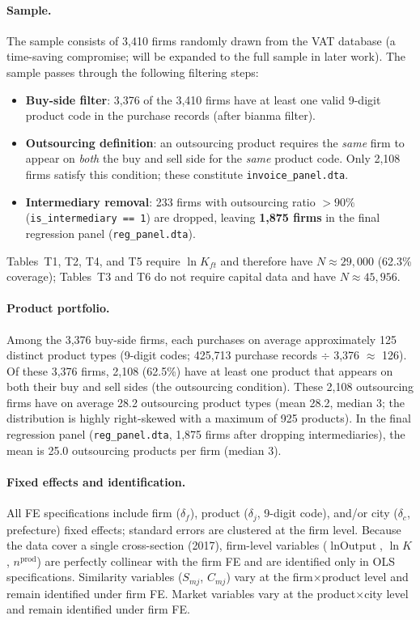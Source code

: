 \documentclass[12pt]{article}
\begin{document}
\paragraph{Sample.}
The sample consists of 3,410 firms randomly drawn from the VAT database
(a time-saving compromise; will be expanded to the full sample in later work).
The sample passes through the following filtering steps:
\begin{itemize}[leftmargin=1.5em,nosep]
  \item \textbf{Buy-side filter}: 3,376 of the 3,410 firms have at least one
    valid 9-digit product code in the purchase records (after bianma filter).
  \item \textbf{Outsourcing definition}: an outsourcing product requires the
    \emph{same} firm to appear on \emph{both} the buy and sell side for the
    \emph{same} product code. Only 2,108 firms satisfy this condition;
    these constitute \texttt{invoice\_panel.dta}.
  \item \textbf{Intermediary removal}: 233 firms with outsourcing ratio
    \(>90\%\) (\texttt{is\_intermediary == 1}) are dropped, leaving
    \textbf{1,875 firms} in the final regression panel
    (\texttt{reg\_panel.dta}).
\end{itemize}
Tables~T1, T2, T4, and T5 require \(\ln K_{ft}\) and therefore have
\(N \approx 29{,}000\) (62.3\% coverage); Tables~T3 and T6 do not require
capital data and have \(N \approx 45{,}956\).

\paragraph{Product portfolio.}
Among the 3,376 buy-side firms, each purchases on average approximately 125
distinct product types (9-digit codes; 425,713 purchase records
\(\div\) 3,376 \(\approx\) 126).
Of these 3,376 firms, 2,108 (62.5\%) have at least one product that appears
on both their buy and sell sides (the outsourcing condition).
These 2,108 outsourcing firms have on average 28.2 outsourcing product types
(mean 28.2, median 3; the distribution is highly right-skewed with a maximum
of 925 products).
In the final regression panel (\texttt{reg\_panel.dta}, 1,875 firms after
dropping intermediaries), the mean is 25.0 outsourcing products per firm
(median 3).

\paragraph{Fixed effects and identification.}
All FE specifications include firm (\(\delta_f\)), product (\(\delta_j\), 9-digit
code), and/or city (\(\delta_c\), prefecture) fixed effects; standard errors are
clustered at the firm level.
Because the data cover a single cross-section (2017), firm-level variables
(\(\ln\text{Output}\), \(\ln K\), \(n^{\text{prod}}\)) are perfectly
collinear with the firm FE and are identified only in OLS specifications.
Similarity variables (\(S_{mj}\), \(C_{mj}\)) vary at the firm\(\times\)product
level and remain identified under firm FE.
Market variables vary at the product\(\times\)city level and remain identified
under firm FE.
\end{document}
